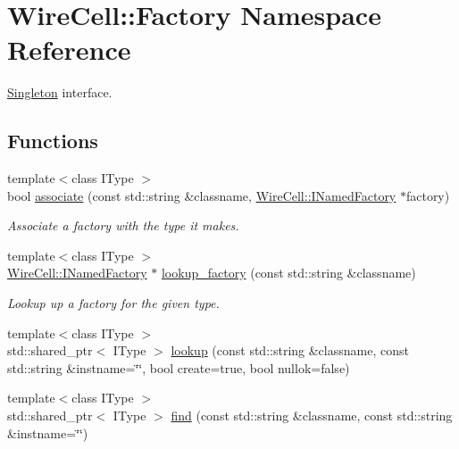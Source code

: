\hypertarget{namespace_wire_cell_1_1_factory}{}\section{Wire\+Cell\+:\+:Factory Namespace Reference}
\label{namespace_wire_cell_1_1_factory}


\hyperlink{class_wire_cell_1_1_singleton}{Singleton} interface.  


\subsection*{Functions}
\begin{DoxyCompactItemize}
\item 
{\footnotesize template$<$class I\+Type $>$ }\\bool \hyperlink{namespace_wire_cell_1_1_factory_ae6f78981e3c42c6df31f8face901e982}{associate} (const std\+::string \&classname, \hyperlink{class_wire_cell_1_1_i_named_factory}{Wire\+Cell\+::\+I\+Named\+Factory} $\ast$factory)
\begin{DoxyCompactList}\small\item\em Associate a factory with the type it makes. \end{DoxyCompactList}\item 
{\footnotesize template$<$class I\+Type $>$ }\\\hyperlink{class_wire_cell_1_1_i_named_factory}{Wire\+Cell\+::\+I\+Named\+Factory} $\ast$ \hyperlink{namespace_wire_cell_1_1_factory_a33318e89ff05184cf57267d20bdc076c}{lookup\+\_\+factory} (const std\+::string \&classname)
\begin{DoxyCompactList}\small\item\em Lookup up a factory for the given type. \end{DoxyCompactList}\item 
{\footnotesize template$<$class I\+Type $>$ }\\std\+::shared\+\_\+ptr$<$ I\+Type $>$ \hyperlink{namespace_wire_cell_1_1_factory_a17712091b6e64cd7936ec21901b32b39}{lookup} (const std\+::string \&classname, const std\+::string \&instname=\char`\"{}\char`\"{}, bool create=true, bool nullok=false)
\item 
{\footnotesize template$<$class I\+Type $>$ }\\std\+::shared\+\_\+ptr$<$ I\+Type $>$ \hyperlink{namespace_wire_cell_1_1_factory_abfb60a87055b2837f69e65cd27d9cb26}{find} (const std\+::string \&classname, const std\+::string \&instname=\char`\"{}\char`\"{})

\end{DoxyCompactItemize}

